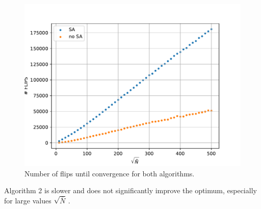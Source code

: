 \documentclass[bachelor,       %
               twoside,        %
               BCOR10mm,       %
               ngerman, english %
               ]{GAUBM}
\begin{document}
\begin{figure}[h]
    \centering
    \includegraphics[width=0.6\linewidth]{figures/flips_var_nbar.pdf}
    \caption{Number of flips until convergence for both algorithms.}
    \label{fig:flips}
\end{figure}


Algorithm 2 is slower and does not significantly improve the optimum, especially for large values $\sqrt{\bar N}\,.$ 






\end{document}
